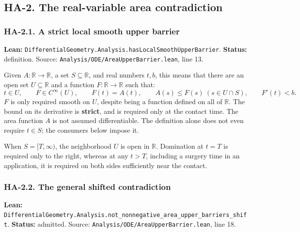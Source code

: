 \documentclass[
  letterpaper,
  11pt]{article}
\begin{document}
\subsection{HA-2. The real-variable area contradiction}\label{ha-2}

\subsubsection{HA-2.1. A strict local smooth upper
barrier}\label{ha-2-1}

\textbf{Lean:}
{\small\texttt{Differential\allowbreak{}Geometry.\allowbreak{}Analysis.\allowbreak{}has\allowbreak{}Local\allowbreak{}Smooth\allowbreak{}Upper\allowbreak{}Barrier}}.
\textbf{Status:} definition. Source:
{\small\texttt{Analysis/\allowbreak{}ODE/\allowbreak{}Area\allowbreak{}Upper\allowbreak{}Barrier.\allowbreak{}lean}},
line 13.

Given \(A:\mathbb R\to\mathbb R\), a set \(S\subseteq\mathbb R\), and
real numbers \(t,b\), this means that there are an open set
\(U\subseteq\mathbb R\) and a function \(F:\mathbb R\to\mathbb R\) such
that: \[
 t\in U,\qquad F\in C^\infty(U),\qquad F(t)=A(t),
 \qquad A(s)\le F(s)\ (s\in U\cap S),\qquad F'(t)<b.
\] \(F\) is only required smooth on \(U\), despite being a function
defined on all of \(\mathbb R\). The bound on its derivative is
\textbf{strict}, and is required only at the contact time. The area
function \(A\) is not assumed differentiable. The definition alone does
not even require \(t\in S\); the consumers below impose it.

When \(S=[T,\infty)\), the neighborhood \(U\) is open in \(\mathbb R\).
Domination at \(t=T\) is required only to the right, whereas at any
\(t>T\), including a surgery time in an application, it is required on
both sides sufficiently near the contact.

\subsubsection{HA-2.2. The general shifted contradiction}\label{ha-2-2}

\textbf{Lean:}
{\small\texttt{Differential\allowbreak{}Geometry.\allowbreak{}Analysis.\allowbreak{}not\_\allowbreak{}nonnegative\_\allowbreak{}area\_\allowbreak{}upper\_\allowbreak{}barriers\_\allowbreak{}shift}}.
\textbf{Status:} admitted. Source:
{\small\texttt{Analysis/\allowbreak{}ODE/\allowbreak{}Area\allowbreak{}Upper\allowbreak{}Barrier.\allowbreak{}lean}},
line 18.
\end{document}
